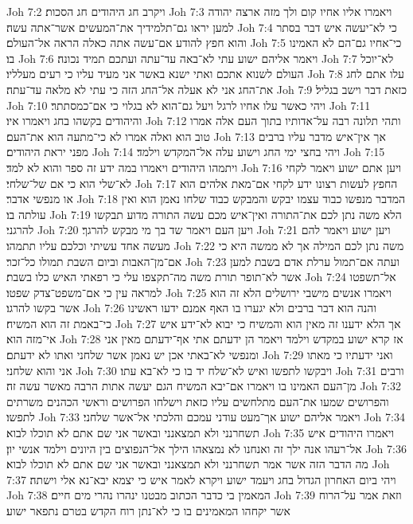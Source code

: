 Joh 7:2  ויקרב חג היהודים חג הסכות׃
Joh 7:3  ויאמרו אליו אחיו קום ולך מזה ארצה יהודה למען יראו גם־תלמידיך את־המעשים אשר־אתה עשה׃
Joh 7:4  כי לא־יעשה איש דבר בסתר והוא חפץ להודע אם־עשה אתה כאלה הראה אל־העולם׃
Joh 7:5  כי־אחיו גם־הם לא האמינו בו׃
Joh 7:6  ויאמר אליהם ישוע עתי לא־באה עד־עתה ועתכם תמיד נכונה׃
Joh 7:7  לא־יוכל העולם לשנוא אתכם ואתי ישנא באשר אני מעיד עליו כי רעים מעלליו׃
Joh 7:8  עלו אתם לחג את־החג אני לא אעלה אל־החג הזה כי עתי לא מלאה עד־עתה׃
Joh 7:9  כזאת דבר וישב בגליל׃
Joh 7:10  ויהי כאשר עלו אחיו לרגל ויעל גם־הוא לא בגלוי כי אם־כמסתתר׃
Joh 7:11  והיהודים בקשהו בחג ויאמרו איו׃
Joh 7:12  ותהי תלונה רבה על־אדותיו בתוך העם אלה אמרו טוב הוא ואלה אמרו לא כי־מתעה הוא את־העם׃
Joh 7:13  אך אין־איש מדבר עליו ברבים מפני יראת היהודים׃
Joh 7:14  ויהי בחצי ימי החג וישוע עלה אל־המקדש וילמד׃
Joh 7:15  ויתמהו היהודים ויאמרו במה ידע זה ספר והוא לא למד׃
Joh 7:16  ויען אתם ישוע ויאמר לקחי לא־שלי הוא כי אם של־שלחי׃
Joh 7:17  החפץ לעשות רצונו ידע לקחי אם־מאת אלהים הוא או מנפשי אדבר׃
Joh 7:18  המדבר מנפשו כבוד עצמו יבקש והמבקש כבוד שלחו נאמן הוא ואין עולתה בו׃
Joh 7:19  הלא משה נתן לכם את־התורה ואין־איש מכם עשה התורה מדוע תבקשו להרגני׃
Joh 7:20  ויען העם ויאמר שד בך מי מבקש להרגך׃
Joh 7:21  ויען ישוע ויאמר להם מעשה אחד עשיתי וכלכם עליו תתמהו׃
Joh 7:22  משה נתן לכם המילה אך לא ממשה היא כי אם־מן־האבות וביום השבת תמולו כל־זכר׃
Joh 7:23  ועתה אם־תמול ערלת אדם בשבת למען אשר לא־תופר תורת משה מה־תקצפו עלי כי רפאתי האיש כלו בשבת׃
Joh 7:24  אל־תשפטו למראה עין כי אם־משפט־צדק שפטו׃
Joh 7:25  ויאמרו אנשים מישבי ירושלים הלא זה הוא אשר בקשו להרגו׃
Joh 7:26  והנה הוא דבר ברבים ולא יגערו בו האף אמנם ידעו ראשינו כי־באמת זה הוא המשיח׃
Joh 7:27  אך הלא ידענו זה מאין הוא והמשיח כי יבוא לא־ידע איש אי־מזה הוא׃
Joh 7:28  אז קרא ישוע במקדש וילמד ויאמר הן ידעתם אתי אף־ידעתם מאין אני ומנפשי לא־באתי אכן יש נאמן אשר שלחני ואתו לא ידעתם׃
Joh 7:29  ואני ידעתיו כי מאתו אני והוא שלחני׃
Joh 7:30  ויבקשו לתפשו ואיש לא־שלח יד בו כי לא־בא עתו׃
Joh 7:31  ורבים מן־העם האמינו בו ויאמרו אם־יבא המשיח הגם יעשה אתות הרבה מאשר עשה זה׃
Joh 7:32  והפרושים שמעו את־העם מתלחשים עליו כזאת וישלחו הפרושים וראשי הכהנים משרתים לתפשו׃
Joh 7:33  ויאמר אליהם ישוע אך־מעט עודני עמכם והלכתי אל־אשר שלחני׃
Joh 7:34  תשחרנני ולא תמצאנני ובאשר אני שם אתם לא תוכלו לבוא׃
Joh 7:35  ויאמרו היהודים איש אל־רעהו אנה ילך זה ואנחנו לא נמצאהו הילך אל־הנפוצים בין היונים וילמד אנשי יון׃
Joh 7:36  מה הדבר הזה אשר אמר תשחרנני ולא תמצאנני ובאשר אני שם אתם לא תוכלו לבוא׃
Joh 7:37  ויהי ביום האחרון הגדול בחג ויעמד ישוע ויקרא לאמר איש כי יצמא יבא־נא אלי וישתה׃
Joh 7:38  המאמין בי כדבר הכתוב מבטנו ינהרו נהרי מים חיים׃
Joh 7:39  וזאת אמר על־הרוח אשר יקחהו המאמינים בו כי לא־נתן רוח הקדש בטרם נתפאר ישוע׃
